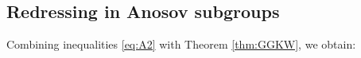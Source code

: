 \documentclass[12pt]{amsbook}%
\theoremstyle{definition}
\theoremstyle{remark}
\numberwithin{section}{chapter}
\numberwithin{subsection}{section}
\numberwithin{figure}{chapter}
\DeclareMathOperator{\C}{\mathbb{C}}
\begin{document}
{{%





\subsection{Redressing in Anosov subgroups}\label{sec_redressing_anosov}



Combining inequalities \eqref{eq:A2} with Theorem \ref{thm:GGKW}, we obtain:

}}
\end{document}
